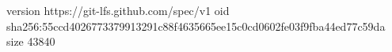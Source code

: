 version https://git-lfs.github.com/spec/v1
oid sha256:55ccd4026773379913291c88f4635665ee15c0cd0602fe03f9fba44ed77c59da
size 43840
